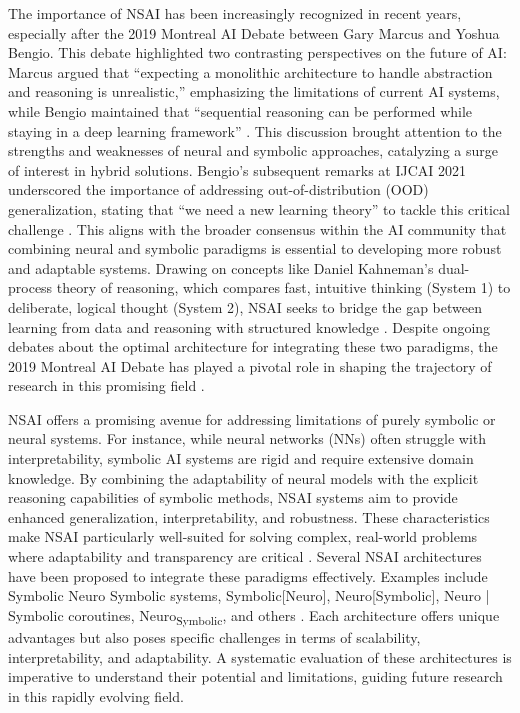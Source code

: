 \documentclass[12pt]{article}
\begin{document}
\vspace*{0.5cm}

The importance of NSAI has been increasingly recognized in recent years, especially after the 2019 Montreal AI Debate between Gary Marcus and Yoshua Bengio. This debate highlighted two contrasting perspectives on the future of AI: Marcus argued that “expecting a monolithic architecture to handle abstraction and reasoning is unrealistic,” emphasizing the limitations of current AI systems, while Bengio maintained that “sequential reasoning can be performed while staying in a deep learning framework” \cite{bengio2019ai}. This discussion brought attention to the strengths and weaknesses of neural and symbolic approaches, catalyzing a surge of interest in hybrid solutions. Bengio’s subsequent remarks at IJCAI 2021 underscored the importance of addressing out-of-distribution (OOD) generalization, stating that “we need a new learning theory” to tackle this critical challenge \cite{bengio2022system}. This aligns with the broader consensus within the AI community that combining neural and symbolic paradigms is essential to developing more robust and adaptable systems. Drawing on concepts like Daniel Kahneman’s dual-process theory of reasoning, which compares fast, intuitive thinking (System 1) to deliberate, logical thought (System 2), NSAI seeks to bridge the gap between learning from data and reasoning with structured knowledge \cite{marcus2019rebooting}. Despite ongoing debates about the optimal architecture for integrating these two paradigms, the 2019 Montreal AI Debate has played a pivotal role in shaping the trajectory of research in this promising field \cite{marcus2018deep, liu2022neural, zhang2021neural, lamb2020graph, von2021informed, belle2020symbolic}.

\vspace*{0.5cm}

NSAI offers a promising avenue for addressing limitations of purely symbolic or neural systems. For instance, while neural networks (NNs) often struggle with interpretability, symbolic AI systems are rigid and require extensive domain knowledge. By combining the adaptability of neural models with the explicit reasoning capabilities of symbolic methods, NSAI systems aim to provide enhanced generalization, interpretability, and robustness. These characteristics make NSAI particularly well-suited for solving complex, real-world problems where adaptability and transparency are critical \cite{hamilton2024neuro}. Several NSAI architectures have been proposed to integrate these paradigms effectively. Examples include Symbolic Neuro Symbolic systems, Symbolic[Neuro], Neuro[Symbolic], Neuro | Symbolic coroutines, Neuro\textsubscript{Symbolic}, and others \cite{kautz2022third}. Each architecture offers unique advantages but also poses specific challenges in terms of scalability, interpretability, and adaptability. A systematic evaluation of these architectures is imperative to understand their potential and limitations, guiding future research in this rapidly evolving field.
\end{document}
